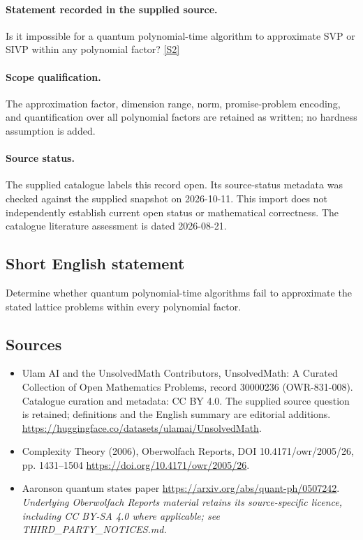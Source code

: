 \documentclass[11pt]{article}
\begin{document}
\paragraph{Statement recorded in the supplied source.}
Is it impossible for a quantum polynomial-time algorithm to approximate SVP or SIVP within any polynomial factor? \href{https://doi.org/10.4171/owr/2005/26}{[S2]}
\paragraph{Scope qualification.}
The approximation factor, dimension range, norm, promise-problem encoding, and quantification over all polynomial factors are retained as written; no hardness assumption is added.
\paragraph{Source status.}
The supplied catalogue labels this record open. Its source-status metadata was checked against the supplied snapshot on 2026-10-11. This import does not independently establish current open status or mathematical correctness. The catalogue literature assessment is dated 2026-08-21.
\subsection{Short English statement}
Determine whether quantum polynomial-time algorithms fail to approximate the stated lattice problems within every polynomial factor.
\subsection{Sources}
\begin{itemize}
\item[S1] Ulam AI and the UnsolvedMath Contributors, UnsolvedMath: A Curated Collection of Open Mathematics Problems, record 30000236 (OWR-831-008). Catalogue curation and metadata: CC BY 4.0. The supplied source question is retained; definitions and the English summary are editorial additions.
\url{https://huggingface.co/datasets/ulamai/UnsolvedMath}.
\item[S2] Complexity Theory (2006), Oberwolfach Reports, DOI 10.4171/owr/2005/26, pp. 1431--1504
\url{https://doi.org/10.4171/owr/2005/26}.
\item[S3] Aaronson quantum states paper
\url{https://arxiv.org/abs/quant-ph/0507242}.
\textit{Underlying Oberwolfach Reports material retains its source-specific licence, including CC BY-SA 4.0 where applicable; see THIRD\_PARTY\_NOTICES.md.}
\end{itemize}
\end{document}
